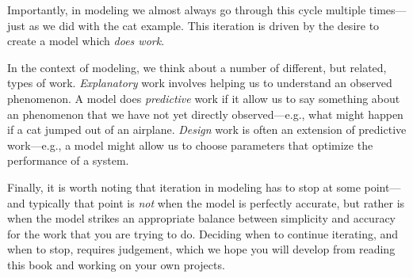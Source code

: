 Importantly, in modeling we almost always go through this cycle
multiple times---just as we did with the cat example.  This iteration
is driven by the desire to create a model which {\it does work}.

In the context of modeling, we think about a number of different, but
related, types of work.  {\it Explanatory} work involves helping us to
understand an observed phenomenon.  A model does {\it predictive} work
if it allow us to say something about an phenomenon that we have not
yet directly observed---e.g., what might happen if a cat jumped out of
an airplane.  {\it Design} work is often an extension of predictive
work---e.g., a model might allow us to choose parameters that optimize
the performance of a system.

Finally, it is worth noting that iteration in modeling has to stop at
some point---and typically that point is {\it not} when the model is
perfectly accurate, but rather is when the model strikes an
appropriate balance between simplicity and accuracy for the work that
you are trying to do.  Deciding when to continue iterating, and when
to stop, requires judgement, which we hope you will develop from reading
this book and working on your own projects.
